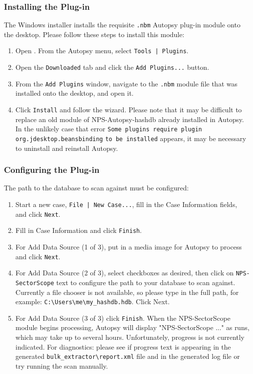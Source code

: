 \documentclass[11pt,fleqn]{article} %
\begin{document}
\subsubsection{Installing the \sscope Plug-in}
The \sscope Windows installer installs the requisite \verb+.nbm+ Autopsy plug-in module onto the desktop. Please follow these steps to install this module:

\begin{enumerate}
\item Open \aut. From the Autopsy menu, select \verb+Tools | Plugins+.
\item Open the \verb+Downloaded+ tab and click the \verb+Add Plugins...+ button.
\item From the \verb+Add Plugins+ window, navigate to the \verb+.nbm+ module file that was installed onto the desktop, and open it.
\item Click \verb+Install+ and follow the wizard. Please note that it may be difficult to replace an old module of NPS-Autopsy-hashdb already installed in Autopsy. In the unlikely case that error \verb+Some plugins require plugin org.jdesktop.beansbinding+ \verb+to be installed+ appears, it may be necessary to uninstall and reinstall Autopsy.
\end{enumerate}

\subsubsection{Configuring the \sscope Plug-in}
The path to the \hdb database to scan against must be configured:

\begin{enumerate}
\item Start a new case, \verb+File | New Case...+, fill in the Case Information fields, and click \verb+Next+.
\item Fill in Case Information and click \verb+Finish+.
\item For Add Data Source (1 of 3), put in a media image for Autopsy to process and click \verb+Next+.
\item For Add Data Source (2 of 3), select checkboxes as desired, then click on \verb+NPS-SectorScope+ text to configure the path to your \hdb database to scan against. Currently a file chooser is not available, so please type in the full path, for example: \verb+C:\Users\me\my_hashdb.hdb+. Click Next.
\item For Add Data Source (3 of 3) click \verb+Finish+. When the NPS-SectorScope module begins processing, Autopsy will display "NPS-SectorScope ..." as \bulk runs, which may take up to several hours. Unfortunately, \bulk progress is not currently indicated. For diagnostics: please see if progress text is appearing in the generated \verb+bulk_extractor\report.xml+ file and in the generated log file or try running the scan manually.
\end{enumerate}
\end{document}
